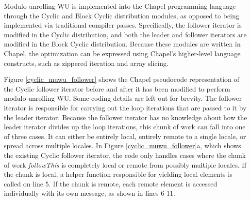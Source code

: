 Modulo unrolling WU is implemented into the Chapel programming language through the Cyclic and Block Cyclic distribution modules, as opposed to being implemented via traditional compiler passes. Specifically, the follower iterator is modified in the Cyclic distribution, and both the leader and follower iterators are modified in the Block Cyclic distribution. Because these modules are written in Chapel, the optimization can be expressed using Chapel's higher-level language constructs, such as zippered iteration and array slicing. 

Figure \ref{cyclic_muwu_follower} shows the Chapel pseudocode representation of the Cyclic follower iterator before and after it has been modified to perform modulo unrolling WU. Some coding details are left out for brevity. The follower iterator is responsible for carrying out the loop iterations that are passed to it by the leader iterator. Because the follower iterator has no knowledge about how the leader iterator divides up the loop iterations, this chunk of work can fall into one of three cases. It can either be entirely local, entirely remote to a single locale, or spread across multiple locales. In Figure \ref{cyclic_muwu_follower}a, which shows the existing Cyclic follower iterator, the code only handles cases where the chunk of work \textit{followThis} is completely local or remote from possibly multiple locales. If the chunk is local, a helper function responsible for yielding local elements is called on line 5. If the chunk is remote, each remote element is accessed individually with its own message, as shown in lines 6-11. 

